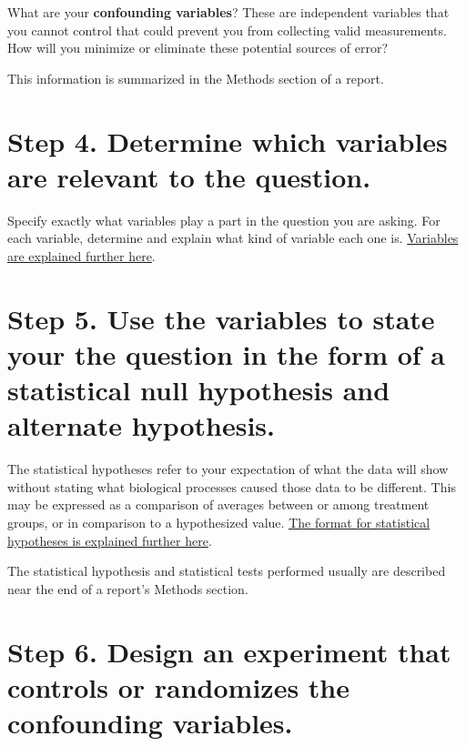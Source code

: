 \documentclass[
]{book}
\begin{document}
What are your \textbf{confounding variables}? These are independent variables that you cannot control that could prevent you from collecting valid measurements. How will you minimize or eliminate these potential sources of error?

This information is summarized in the Methods section of a report.

\hypertarget{step-4.-determine-which-variables-are-relevant-to-the-question.}{%
\section*{Step 4. Determine which variables are relevant to the question.}\label{step-4.-determine-which-variables-are-relevant-to-the-question.}}

Specify exactly what variables play a part in the question you are asking. For each variable, determine and explain what kind of variable each one is. \protect\hyperlink{variables215}{Variables are explained further here}.

\hypertarget{step-5.-use-the-variables-to-state-your-the-question-in-the-form-of-a-statistical-null-hypothesis-and-alternate-hypothesis.}{%
\section*{Step 5. Use the variables to state your the question in the form of a statistical null hypothesis and alternate hypothesis.}\label{step-5.-use-the-variables-to-state-your-the-question-in-the-form-of-a-statistical-null-hypothesis-and-alternate-hypothesis.}}

The statistical hypotheses refer to your expectation of what the data will show without stating what biological processes caused those data to be different. This may be expressed as a comparison of averages between or among treatment groups, or in comparison to a hypothesized value. \protect\hyperlink{compstatsone470}{The format for statistical hypotheses is explained further here}.

The statistical hypothesis and statistical tests performed usually are described near the end of a report's Methods section.

\hypertarget{step-6.-design-an-experiment-that-controls-or-randomizes-the-confounding-variables.}{%
\section*{Step 6. Design an experiment that controls or randomizes the confounding variables.}\label{step-6.-design-an-experiment-that-controls-or-randomizes-the-confounding-variables.}}
\end{document}
